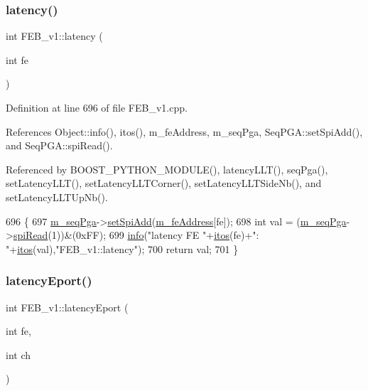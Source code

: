 \subsubsection{\texorpdfstring{latency()}{latency()}}
{\footnotesize\ttfamily int F\+E\+B\+\_\+v1\+::latency (\begin{DoxyParamCaption}\item[{int}]{fe }\end{DoxyParamCaption})}



Definition at line 696 of file F\+E\+B\+\_\+v1.\+cpp.



References Object\+::info(), itos(), m\+\_\+fe\+Address, m\+\_\+seq\+Pga, Seq\+P\+G\+A\+::set\+Spi\+Add(), and Seq\+P\+G\+A\+::spi\+Read().



Referenced by B\+O\+O\+S\+T\+\_\+\+P\+Y\+T\+H\+O\+N\+\_\+\+M\+O\+D\+U\+L\+E(), latency\+L\+L\+T(), seq\+Pga(), set\+Latency\+L\+L\+T(), set\+Latency\+L\+L\+T\+Corner(), set\+Latency\+L\+L\+T\+Side\+Nb(), and set\+Latency\+L\+L\+T\+Up\+Nb().


\begin{DoxyCode}
696                            \{
697   \hyperlink{classFEB__v1_a6c7804ac86796f233a8393043adf2e77}{m\_seqPga}->\hyperlink{classSeqPGA_ac998ce3a6d9b5f2e88cc8393f8c1df53}{setSpiAdd}(\hyperlink{classFEB__v1_a4e1945c2d5b434125f375e9d0fc6d99f}{m\_feAddress}[fe]);
698   \textcolor{keywordtype}{int} val = (\hyperlink{classFEB__v1_a6c7804ac86796f233a8393043adf2e77}{m\_seqPga}->\hyperlink{classSeqPGA_ab3d0e5e5d4014bc7a92588a76b8713d4}{spiRead}(1))&(0xFF);
699   \hyperlink{classObject_a644fd329ea4cb85f54fa6846484b84a8}{info}(\textcolor{stringliteral}{"latency FE "}+\hyperlink{Tools_8h_af330027dbdafb9a30768b3613c553e60}{itos}(fe)+\textcolor{stringliteral}{": "}+\hyperlink{Tools_8h_af330027dbdafb9a30768b3613c553e60}{itos}(val),\textcolor{stringliteral}{"FEB\_v1::latency"});
700   \textcolor{keywordflow}{return} val;
701 \}
\end{DoxyCode}
\mbox{\label{classFEB__v1_a8ab1ff429d357779d682bdf28504bdd2}} 
\subsubsection{\texorpdfstring{latency\+Eport()}{latencyEport()}}
{\footnotesize\ttfamily int F\+E\+B\+\_\+v1\+::latency\+Eport (\begin{DoxyParamCaption}\item[{int}]{fe,  }\item[{int}]{ch }\end{DoxyParamCaption})}



